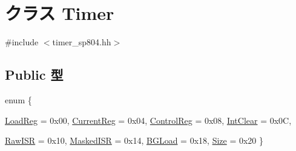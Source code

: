 \hypertarget{classSp804_1_1Timer}{
\section{クラス Timer}
\label{classSp804_1_1Timer}
}


{\ttfamily \#include $<$timer\_\-sp804.hh$>$}\subsection*{Public 型}
\begin{DoxyCompactItemize}
\item 
enum \{ \par
\hyperlink{classSp804_1_1Timer_a84627a72058502328269676b81780f89af1b4cf2000c66476aa951689a85d5843}{LoadReg} =  0x00, 
\hyperlink{classSp804_1_1Timer_a84627a72058502328269676b81780f89a2a0562a793d401c2e65bcd4ea5bf7aab}{CurrentReg} =  0x04, 
\hyperlink{classSp804_1_1Timer_a84627a72058502328269676b81780f89a794a3f84717e8b4e7c8af89cbe9f7441}{ControlReg} =  0x08, 
\hyperlink{classSp804_1_1Timer_a84627a72058502328269676b81780f89adba6b9695c70b08e0a47bf9b1c0eaeab}{IntClear} =  0x0C, 
\par
\hyperlink{classSp804_1_1Timer_a84627a72058502328269676b81780f89abd636a57d30c6af5f7a2eabb4e4258cd}{RawISR} =  0x10, 
\hyperlink{classSp804_1_1Timer_a84627a72058502328269676b81780f89a84e908ced233cc8a35eabafa2c2acf93}{MaskedISR} =  0x14, 
\hyperlink{classSp804_1_1Timer_a84627a72058502328269676b81780f89a880658e75f8f318562e66aca33089115}{BGLoad} =  0x18, 
\hyperlink{classSp804_1_1Timer_a84627a72058502328269676b81780f89aff9abf2b1a689f70a77a18da50c01d9f}{Size} =  0x20
 \}
\end{DoxyCompactItemize}
